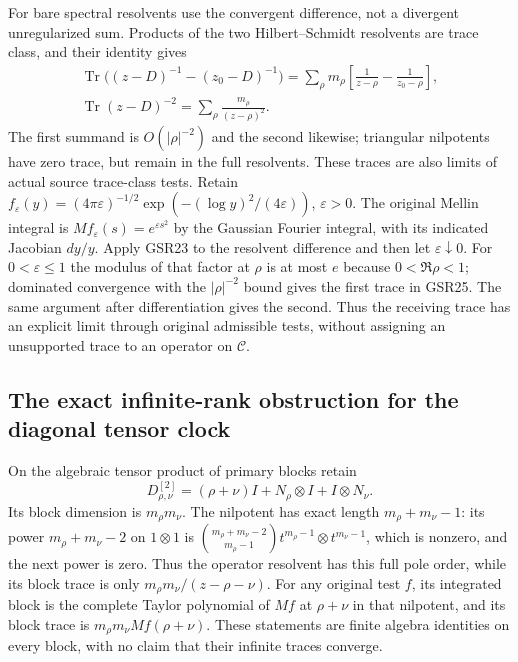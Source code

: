 For bare spectral resolvents
use the convergent difference,
not a divergent unregularized
sum. Products of the two
Hilbert--Schmidt resolvents are
trace class, and their identity
gives
\begin{equation}\tag{GSR25}
 \begin{gathered}
 \operatorname{Tr}\bigl((z-D)^{-1}-(z_0-D)^{-1}\bigr)
  =\sum_\rho m_\rho
       \left[\frac1{z-\rho}-\frac1{z_0-\rho}\right],\\
 \operatorname{Tr}(z-D)^{-2}
                   =\sum_\rho\frac{m_\rho}{(z-\rho)^2}.
 \end{gathered}
\end{equation}
The first summand is $O(|\rho|^{-2})$
and the second likewise; triangular
nilpotents have zero trace, but
remain in the full resolvents.
These traces are also limits of
actual source trace-class tests.
Retain
$f_\varepsilon(y)=(4\pi\varepsilon)^{-1/2}
\exp(-(\log y)^2/(4\varepsilon))$, $\varepsilon>0$.
The original Mellin integral
is $Mf_\varepsilon(s)=e^{\varepsilon s^2}$
by the Gaussian Fourier integral,
with its indicated Jacobian
$dy/y$. Apply GSR23 to the
resolvent difference and then
let $\varepsilon\downarrow0$.
For $0<\varepsilon\le1$ the
modulus of that factor at
$\rho$ is at most $e$ because
$0<\Re\rho<1$; dominated
convergence with the
$|\rho|^{-2}$ bound gives the
first trace in GSR25.
The same argument after
differentiation gives the
second. Thus the receiving
trace has an explicit limit
through original admissible
tests, without assigning an
unsupported trace to an
operator on $\mathcal C$.

\subsection{The exact infinite-rank obstruction for the diagonal tensor clock}

On the algebraic tensor product
of primary blocks retain
\begin{equation}\tag{GSR26}
 D^{[2]}_{\rho,\nu}
     =(\rho+\nu)I+N_\rho\otimes I+I\otimes N_\nu .
\end{equation}
Its block dimension is
$m_\rho m_\nu$. The nilpotent
has exact length
$m_\rho+m_\nu-1$:
its power $m_\rho+m_\nu-2$
on $1\otimes1$ is
$\binom{m_\rho+m_\nu-2}{m_\rho-1}
t^{m_\rho-1}\otimes t^{m_\nu-1}$,
which is nonzero, and the next
power is zero. Thus the
operator resolvent has this
full pole order, while its
block trace is only
$m_\rho m_\nu/(z-\rho-\nu)$.
For any original test $f$,
its integrated block is
the complete Taylor polynomial
of $Mf$ at $\rho+\nu$ in
that nilpotent, and its
block trace is
$m_\rho m_\nu Mf(\rho+\nu)$.
These statements are finite
algebra identities on every
block, with no claim that
their infinite traces converge.

